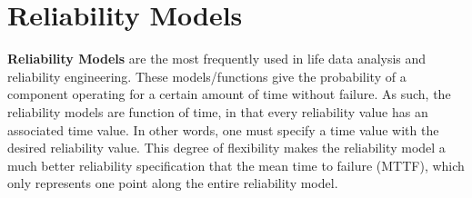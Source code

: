 \section{Reliability Models}
\label{sec:ReliabilityModels}

\newcommand{\aliasRequiredParameterDescription}[1]
{
	\xmlNode{#1}, \xmlDesc{string or float, required parameter}. See the above definition.
	If a string was provided, the reliability model would treat it as an input variable that came
	from other RAVEN entity. In this case, the variable must be listed in the subnode
	\xmlNode{variables} under \xmlNode{ExternalModel}.
}
\newcommand{\aliasOptionalParameterDescription}[1]
{
	\xmlNode{#1}, \xmlDesc{string or float, optional parameter}. See the above definition.
	If a string was provided, the reliability model would treat it as an input variable that came
	from other RAVEN entity. In this case, the variable must be listed in the subnode
	\xmlNode{variables} under \xmlNode{ExternalModel}.
	\default{1}
}

\textbf{Reliability Models} are the most frequently used in life data analysis
and reliability engineering. These models/functions give the probability of a component
operating for a certain amount of time without failure. As such, the reliability models
are function of time, in that every reliability value has an associated time value. In
other words, one must specify a time value with the desired reliability value. This degree
of flexibility makes the reliability model a much better reliability specification that the
mean time to failure (MTTF), which only represents one point along the entire reliability
model.

